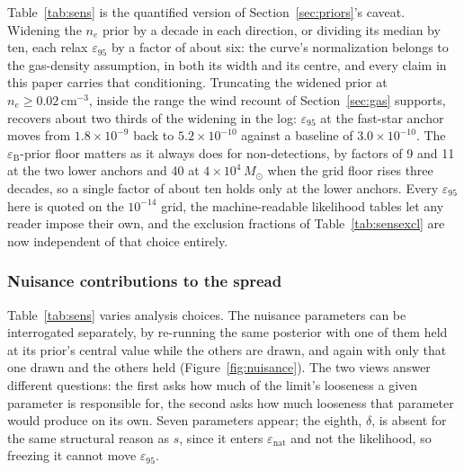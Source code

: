 \documentclass[11pt]{article}
\newcommand{\msun}{\ensuremath{M_\odot}}
\newcommand{\eps}{\ensuremath{\varepsilon_{\mathrm{B}}}}
\newcommand{\epsl}{\ensuremath{\varepsilon_{95}}}
\begin{document}
Table~\ref{tab:sens} is the quantified version of Section~\ref{sec:priors}'s caveat. Widening the $n_{e}$ prior by a decade in each direction, or dividing its median by ten, each relax \epsl{} by a factor of about six: the curve's normalization belongs to the gas-density assumption, in both its width and its centre, and every claim in this paper carries that conditioning. Truncating the widened prior at $n_{e} \geq 0.02\,\mathrm{cm^{-3}}$, inside the range the wind recount of Section~\ref{sec:gas} supports, recovers about two thirds of the widening in the log: \epsl{} at the fast-star anchor moves from $1.8\times10^{-9}$ back to $5.2\times10^{-10}$ against a baseline of $3.0\times10^{-10}$. The $\eps$-prior floor matters as it always does for non-detections, by factors of 9 and 11 at the two lower anchors and 40 at $4\times10^{4}\,\msun$ when the grid floor rises three decades, so a single factor of about ten holds only at the lower anchors. Every \epsl{} here is quoted on the $10^{-14}$ grid, the machine-readable likelihood tables let any reader impose their own, and the exclusion fractions of Table~\ref{tab:sensexcl} are now independent of that choice entirely.

\subsubsection{Nuisance contributions to the spread}
\label{sec:nuisance}

Table~\ref{tab:sens} varies analysis choices. The nuisance parameters can be interrogated separately, by re-running the same posterior with one of them held at its prior's central value while the others are drawn, and again with only that one drawn and the others held (Figure~\ref{fig:nuisance}). The two views answer different questions: the first asks how much of the limit's looseness a given parameter is responsible for, the second asks how much looseness that parameter would produce on its own. Seven parameters appear; the eighth, $\delta$, is absent for the same structural reason as $s$, since it enters $\varepsilon_{\mathrm{nat}}$ and not the likelihood, so freezing it cannot move \epsl.
\end{document}
